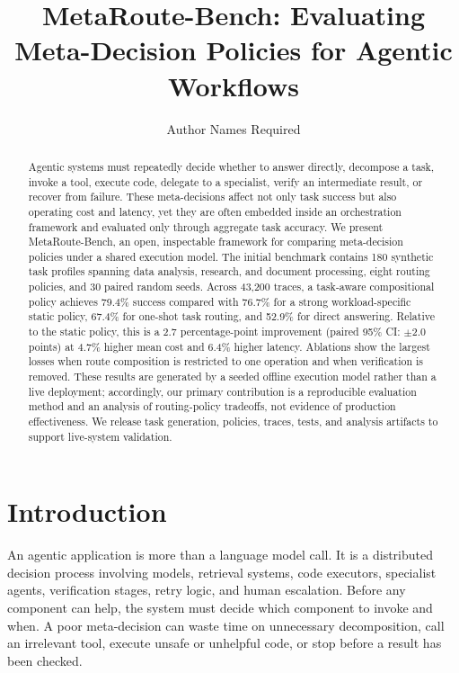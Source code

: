 \documentclass[sigconf]{acmart}
\title{MetaRoute-Bench: Evaluating Meta-Decision Policies for Agentic Workflows}
\author{Author Names Required}
\affiliation{%
  \institution{Organization Required}
  \city{City Required}
  \country{Country Required}}
\begin{document}
\begin{abstract}
Agentic systems must repeatedly decide whether to answer directly, decompose a task, invoke a tool, execute code, delegate to a specialist, verify an intermediate result, or recover from failure. These meta-decisions affect not only task success but also operating cost and latency, yet they are often embedded inside an orchestration framework and evaluated only through aggregate task accuracy. We present MetaRoute-Bench, an open, inspectable framework for comparing meta-decision policies under a shared execution model. The initial benchmark contains 180 synthetic task profiles spanning data analysis, research, and document processing, eight routing policies, and 30 paired random seeds. Across 43,200 traces, a task-aware compositional policy achieves 79.4\% success compared with 76.7\% for a strong workload-specific static policy, 67.4\% for one-shot task routing, and 52.9\% for direct answering. Relative to the static policy, this is a 2.7 percentage-point improvement (paired 95\% CI: $\pm$2.0 points) at 4.7\% higher mean cost and 6.4\% higher latency. Ablations show the largest losses when route composition is restricted to one operation and when verification is removed. These results are generated by a seeded offline execution model rather than a live deployment; accordingly, our primary contribution is a reproducible evaluation method and an analysis of routing-policy tradeoffs, not evidence of production effectiveness. We release task generation, policies, traces, tests, and analysis artifacts to support live-system validation.
\end{abstract}



\maketitle

\section{Introduction}

An agentic application is more than a language model call. It is a distributed decision process involving models, retrieval systems, code executors, specialist agents, verification stages, retry logic, and human escalation. Before any component can help, the system must decide which component to invoke and when. A poor meta-decision can waste time on unnecessary decomposition, call an irrelevant tool, execute unsafe or unhelpful code, or stop before a result has been checked.
\end{document}
